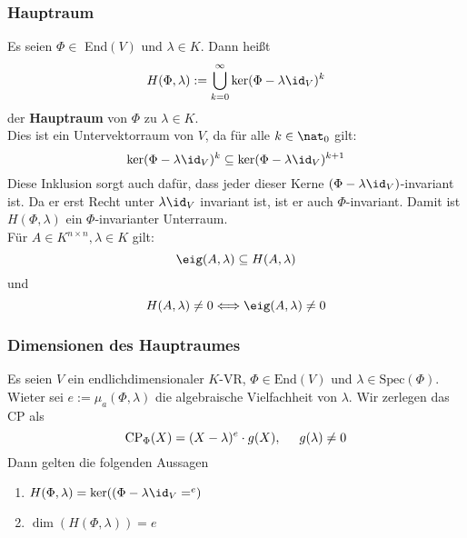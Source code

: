 \documentclass{kit}
\begin{document}
    \subsubsection{Hauptraum}
      Es seien $\Phi\in$ End$(V)$ und $\lambda\in K$. Dann heißt
      $$H(\Phi,\lambda):=\bigcup_{k=0}^\infty\ker(\Phi-\lambda\id_V)^k$$
      der \textbf{Hauptraum} von $\Phi$ zu $\lambda\in K$.\\
      Dies ist ein Untervektorraum von $V$, da für alle $k\in\nat_0$ gilt:
      $$\ker(\Phi-\lambda\id_V)^k\subseteq\ker(\Phi-\lambda\id_V)^{k+1}$$
      Diese Inklusion sorgt auch dafür, dass jeder dieser Kerne $(\Phi-\lambda\id_V)$-invariant ist. Da er erst Recht unter
      $\lambda\id_V$ invariant ist, ist er auch $\Phi$-invariant. Damit ist $H(\Phi,\lambda)$ ein $\Phi$-invarianter 
      Unterraum.\\
      Für $A\in K^{n\times n},\lambda\in K$ gilt:
      $$\eig(A,\lambda)\subseteq H(A,\lambda)$$
      und
      $$H(A,\lambda)\neq0\Longleftrightarrow\eig(A,\lambda)\neq0$$
    \subsubsection{Dimensionen des Hauptraumes}
      Es seien $V$ ein endlichdimensionaler $K$-VR, $\Phi\in\text{End}(V)$ und $\lambda\in\text{Spec}(\Phi)$. Wieter sei
      $e:=\mu_a(\Phi,\lambda)$ die algebraische Vielfachheit von $\lambda$. Wir zerlegen das CP als
      $$\text{CP}_\Phi(X)=(X-\lambda)^e\cdot g(X),\hspace{0.5cm}g(\lambda)\neq0$$
      Dann gelten die folgenden Aussagen
      \begin{enumerate}
        \item $H(\Phi,\lambda)=\ker((\Phi-\lambda\id_V=^e)$
        \item $\dim(H(\Phi,\lambda))=e$
      \end{enumerate}
\end{document}
